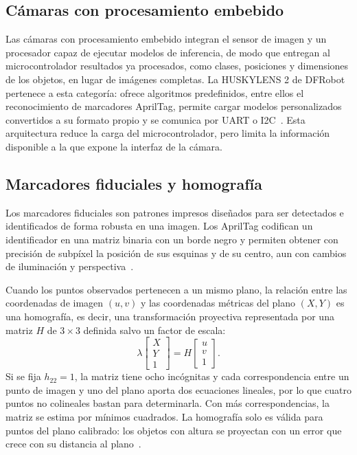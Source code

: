 \subsection{Cámaras con procesamiento embebido}
Las cámaras con procesamiento embebido integran el sensor de imagen y un procesador capaz de ejecutar modelos de inferencia, de modo que entregan al microcontrolador resultados ya procesados, como clases, posiciones y dimensiones de los objetos, en lugar de imágenes completas. La HUSKYLENS 2 de DFRobot pertenece a esta categoría: ofrece algoritmos predefinidos, entre ellos el reconocimiento de marcadores AprilTag, permite cargar modelos personalizados convertidos a su formato propio y se comunica por UART o I2C~\cite{dfrobotHuskylens2,dfrobotHuskylensLib}. Esta arquitectura reduce la carga del microcontrolador, pero limita la información disponible a la que expone la interfaz de la cámara.

\subsection{Marcadores fiduciales y homografía}
Los marcadores fiduciales son patrones impresos diseñados para ser detectados e identificados de forma robusta en una imagen. Los AprilTag codifican un identificador en una matriz binaria con un borde negro y permiten obtener con precisión de subpíxel la posición de sus esquinas y de su centro, aun con cambios de iluminación y perspectiva~\cite{olson2011apriltag,wang2016apriltag2}.

Cuando los puntos observados pertenecen a un mismo plano, la relación entre las coordenadas de imagen $(u,v)$ y las coordenadas métricas del plano $(X,Y)$ es una homografía, es decir, una transformación proyectiva representada por una matriz $H$ de $3\times3$ definida salvo un factor de escala:
\begin{equation}
	\lambda
	\begin{bmatrix} X \\ Y \\ 1 \end{bmatrix}
	= H
	\begin{bmatrix} u \\ v \\ 1 \end{bmatrix}.
\end{equation}
Si se fija $h_{22}=1$, la matriz tiene ocho incógnitas y cada correspondencia entre un punto de imagen y uno del plano aporta dos ecuaciones lineales, por lo que cuatro puntos no colineales bastan para determinarla. Con más correspondencias, la matriz se estima por mínimos cuadrados. La homografía solo es válida para puntos del plano calibrado: los objetos con altura se proyectan con un error que crece con su distancia al plano~\cite{hartley2004multiple,szeliski2022computer}.

